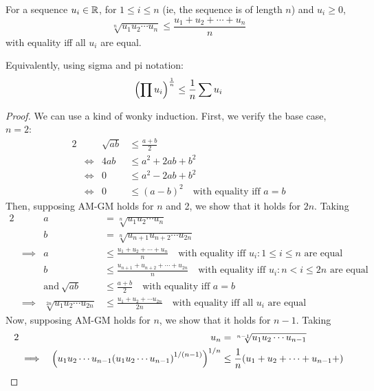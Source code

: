 \begin{theorem}[AM-GM inequality]
For a sequence \(u_i \in \mathbb R\), for \(1 \le i \le n\) (ie, the
sequence is of length \(n\)) and \(u_i \ge 0\),
\begin{equation*}
\sqrt[n]{u_1 u_2 \dotsm u_n} \le \frac{u_1 + u_2 + \dotsb + u_n}n
\end{equation*}
with equality iff all \(u_i\) are equal.

Equivalently, using sigma and pi notation:
\begin{equation*}
\pqty{\prod u_i}^\frac 1n \le \frac 1n\sum u_i
\end{equation*}
\end{theorem}
\begin{proof}
We can use a kind of wonky induction. First, we verify the base
case, \(n = 2\):
\begin{alignat*}2
&&\sqrt{ab} &\le \frac{a + b}2 \\
&\iff& 4ab &\le a^2 + 2ab + b^2 \\
&\iff& 0 &\le a^2 - 2ab + b^2 \\
&\iff& 0 &\le (a - b)^2\quad \text{with equality iff \(a = b\)}
\end{alignat*}
Then, supposing AM-GM holds for \(n\) and 2, we show that it holds for
\(2n\).  Taking
\begin{alignat*}2
&&a &= \sqrt[n]{u_1 u_2 \dotsm u_n} \\
&&b &= \sqrt[n]{u_{n+1} u_{n+2} \dotsm u_{2n}} \\
&\implies& a &\le \frac{u_1 + u_2 + \dotsb + u_n}n
        \quad \text{with equality iff \(u_i: 1 \le i \le n\) are equal}\\
&&b &\le \frac{u_{n + 1} + u_{n + 2} + \dotsb + u_{2n}}n
        \quad \text{with equality iff \(u_i: n < i \le 2n\) are equal}\\
&&\text{and}\ \sqrt{ab} &\le \frac{a + b}2
    \quad \text{with equality iff \(a = b\)}\\
&\implies& \sqrt[2n]{u_1 u_2 \dotsm u_{2n}} &\le
         \frac{u_1 + u_2 + \dotsb u_{2n}}{2n}
            \quad \text{with equality iff all \(u_i\) are equal}
\end{alignat*}
Now, supposing AM-GM holds for \(n\), we show that it holds for \(n - 1\).
Taking
\begin{alignat*}2
&&u_n &= \sqrt[n - 1]{u_1 u_2 \dotsm u_{n - 1}} \\
&\implies& \pqty{u_1 u_2 \dotsm u_{n - 1}
            \pqty{u_1 u_2 \dotsm u_{n - 1}}^{1 / (n - 1)}}^{1 / n}
         &\le \frac 1n \pqty{u_1 + u_2 + \dotsb  + u_{n - 1} +
}
\end{alignat*}
\end{proof}
